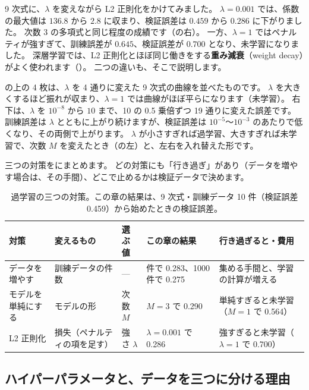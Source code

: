 9 次式に、$\lambda$ を変えながら L2 正則化をかけてみました。
$\lambda=0.001$ では、係数の最大値は $136.8$ から $2.8$ に収まり、検証誤差は $0.459$ から $0.286$ に下がりました。
次数 3 の多項式と同じ程度の成績です（の右）。
一方、$\lambda=1$ ではペナルティが強すぎて、訓練誤差が $0.645$、検証誤差が $0.700$ となり、未学習になりました。
深層学習では、L2 正則化とほぼ同じ働きをする\textbf{重み減衰}（weight decay）がよく使われます（）。
二つの違いも、そこで説明します。

の上の 4 枚は、$\lambda$ を 4 通りに変えた 9 次式の曲線を並べたものです。
$\lambda$ を大きくするほど振れが収まり、$\lambda=1$ では曲線がほぼ平らになります（未学習）。
右下は、$\lambda$ を $10^{-8}$ から $10$ まで、10 の 0.5 乗倍ずつ 19 通りに変えた誤差です。
訓練誤差は $\lambda$ とともに上がり続けますが、検証誤差は $10^{-5}$〜$10^{-3}$ のあたりで低くなり、その両側で上がります。
$\lambda$ が小さすぎれば過学習、大きすぎれば未学習で、次数 $M$ を変えたとき（の左）と、左右を入れ替えた形です。


三つの対策をにまとめます。
どの対策にも「行き過ぎ」があり（データを増やす場合は、その手間）、どこで止めるかは検証データで決めます。

\begin{table}[tbp]
\centering
\caption{過学習の三つの対策。この章の結果は、9 次式・訓練データ 10 件（検証誤差 0.459）から始めたときの検証誤差。}
\label{tab:ml-overfit-remedies}
\small
\begin{tabularx}{\linewidth}{l>{\raggedright\arraybackslash}Xl>{\raggedright\arraybackslash}X>{\raggedright\arraybackslash}X}
\toprule
対策 & 変えるもの & 選ぶ値 & この章の結果 & 行き過ぎると・費用 \\
\midrule
データを増やす & 訓練データの件数 & --- & 100 件で 0.283、1000 件で 0.275 & 集める手間と、学習の計算が増える \\
モデルを単純にする & モデルの形 & 次数 $M$ & $M=3$ で 0.290 & 単純すぎると未学習（$M=1$ で 0.564） \\
L2 正則化 & 損失（ペナルティの項を足す） & 強さ $\lambda$ & $\lambda=0.001$ で 0.286 & 強すぎると未学習（$\lambda=1$ で 0.700） \\
\bottomrule
\end{tabularx}
\end{table}

\subsection*{ハイパーパラメータと、データを三つに分ける理由}

